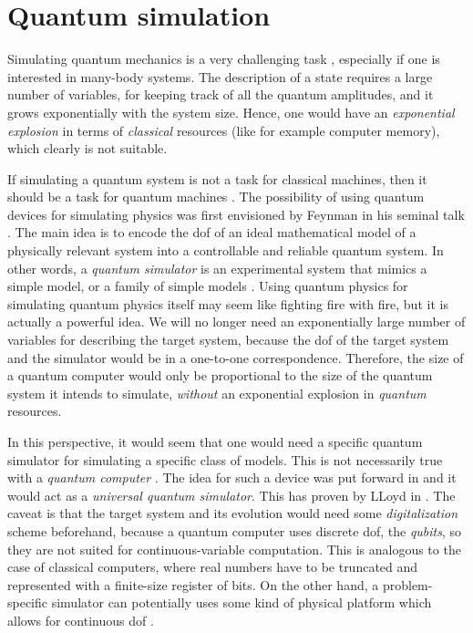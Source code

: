 \section{Quantum simulation}
\label{sec:quantum_simulation}

Simulating quantum mechanics is a very challenging task \cite{manin1980computable, feynman1982simulation}, especially if one is interested in many-body systems.
The description of a state requires a large number of variables, for keeping track of all the quantum amplitudes, and it grows exponentially with the system size.
Hence, one would have an \emph{exponential explosion} in terms of \emph{classical} resources (like for example computer memory), which clearly is not suitable.

If simulating a quantum system is not a task for classical machines, then it should be a task for quantum machines \cite{feynman1982simulation, georgescu2014simulation, hauke2012simulators, kendon2010quantum, buluta2009simulators}.
The possibility of using quantum devices for simulating physics was first envisioned by Feynman in his seminal talk \cite{feynman1982simulation}.
The main idea is to encode the \ac{dof} of an ideal mathematical model of a physically relevant system into a controllable and reliable quantum system.
In other words, a \emph{quantum simulator} is an experimental system that mimics a simple model, or a family of simple models \cite{hauke2012simulators}.
Using quantum physics for simulating quantum physics itself may seem like fighting fire with fire, but it is actually a powerful idea.
We will no longer need an exponentially large number of variables for describing the target system, because the \ac{dof} of the target system and the simulator would be in a one-to-one correspondence.
Therefore, the size of a quantum computer would only be proportional to the size of the quantum system it intends to simulate, \emph{without} an exponential explosion in \emph{quantum} resources.

In this perspective, it would seem that one would need a specific quantum simulator for simulating a specific class of models.
This is not necessarily true with a \emph{quantum computer} \cite{feynman1985quantum, nielsen2010quantum, schleich2007elements, stolze2008quantum}.
The idea for such a device was put forward in \cite{feynman1982simulation, feynman1985quantum} and it would act as a \emph{universal quantum simulator}.
This has proven by LLoyd in \cite{lloyd1996simulator}.
The caveat is that the target system and its evolution would need some \emph{digitalization} scheme beforehand, because a quantum computer uses discrete \ac{dof}, the \emph{qubits}, so they are not suited for continuous-variable computation.
This is analogous to the case of classical computers, where real numbers have to be truncated and represented with a finite-size register of bits.
On the other hand, a problem-specific simulator can potentially uses some kind of physical platform which allows for continuous \ac{dof} \cite{kendon2010quantum, wagner2010continuous}.

